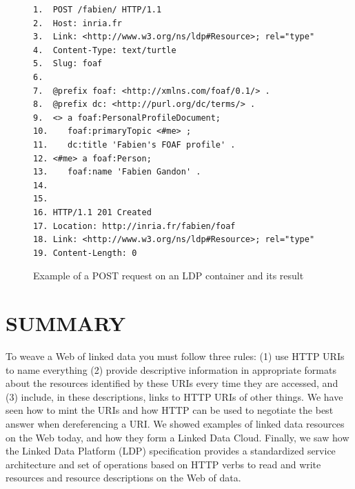 \begin{figure}
  
    \label{fig:ch5.18}
\begin{lstlisting}
1.	POST /fabien/ HTTP/1.1
2.	Host: inria.fr
3.	Link: <http://www.w3.org/ns/ldp#Resource>; rel="type"
4.	Content-Type: text/turtle
5.	Slug: foaf
6.	
7.	@prefix foaf: <http://xmlns.com/foaf/0.1/> .
8.	@prefix dc: <http://purl.org/dc/terms/> .
9.	<> a foaf:PersonalProfileDocument;
10.	   foaf:primaryTopic <#me> ;
11.    dc:title 'Fabien's FOAF profile' .
12.	<#me> a foaf:Person;
13.	   foaf:name 'Fabien Gandon' .
14.	 
15.	 
16.	HTTP/1.1 201 Created
17.	Location: http://inria.fr/fabien/foaf
18.	Link: <http://www.w3.org/ns/ldp#Resource>; rel="type"
19.	Content-Length: 0

\end{lstlisting}
  \caption{Example of a POST request on an LDP container and its result}
  \end{figure}

% 




\hypertarget{summary}{%
\section{SUMMARY}\label{summary:ch5}}

To weave a Web of linked data you must follow three rules: (1) use HTTP
URIs to name everything (2) provide descriptive information in
appropriate formats about the resources identified by these URIs every
time they are accessed, and (3) include, in these descriptions, links to
HTTP URIs of other things. We have seen how to mint the URIs and how
HTTP can be used to negotiate the best answer when dereferencing a URI.
We showed examples of linked data resources on the Web today, and how they form
a Linked Data Cloud. 
Finally, we saw how
the Linked Data Platform (LDP) specification provides a standardized service
architecture and set of operations based on HTTP verbs to read and write
resources and resource descriptions on the Web of data.

